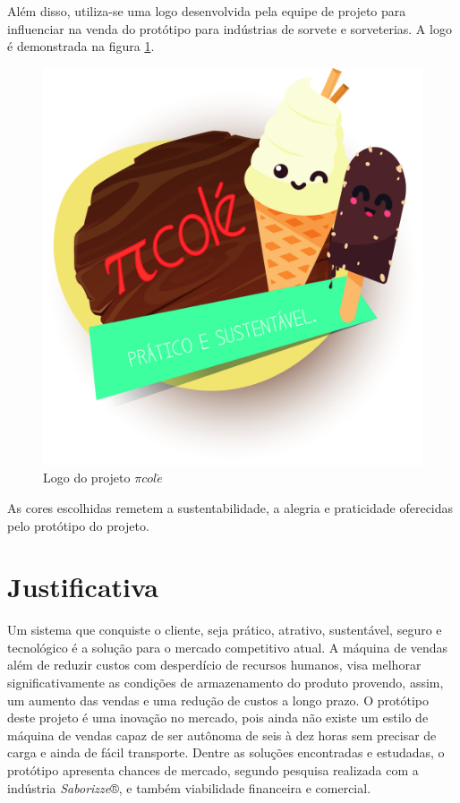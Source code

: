 Além disso, utiliza-se uma logo desenvolvida pela equipe de projeto para influenciar na venda do protótipo para indústrias de sorvete e sorveterias. A logo é demonstrada na figura \ref{fig:logopicole}.

\begin{figure}[H]
	\centering
    \includegraphics[scale=0.2]{figuras/logo_picole}
    \caption{Logo do projeto $\pi col\acute{e}$}
    \label{fig:logopicole}
\end{figure}

As cores escolhidas remetem a sustentabilidade, a alegria e praticidade oferecidas pelo protótipo do projeto. 

\section{Justificativa}

Um sistema que conquiste o cliente, seja prático, atrativo, sustentável, seguro e tecnológico é a solução para o mercado competitivo atual.
A máquina de vendas além de reduzir custos com desperdício de recursos humanos, visa melhorar significativamente as condições de armazenamento do produto provendo, assim, um aumento das vendas e uma redução de custos a longo prazo.
O protótipo deste projeto é uma inovação no mercado, pois ainda não existe um estilo de máquina de vendas capaz de ser autônoma de seis à dez horas sem precisar de carga e ainda de fácil transporte. 
Dentre as soluções encontradas e estudadas, o protótipo apresenta chances de mercado, segundo pesquisa realizada com a indústria \textit{Saborizze}®, e também viabilidade financeira e comercial.

